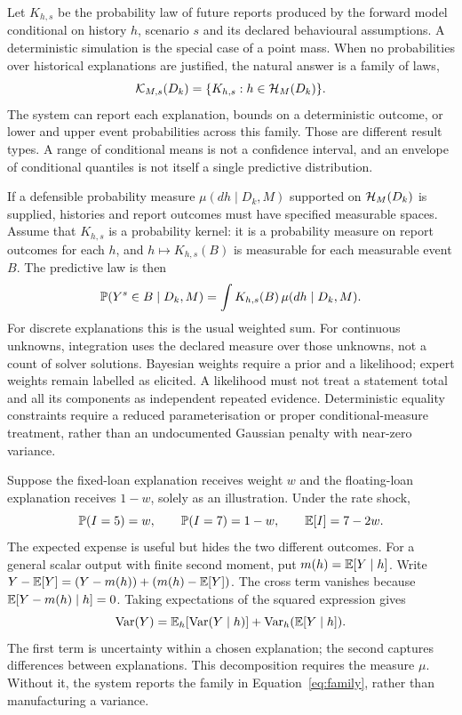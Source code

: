 Let $K_{h,s}$ be the probability law of future reports produced by the forward
model conditional on history $h$, scenario $s$ and its declared behavioural
assumptions. A deterministic simulation is the special case of a point mass.
When no probabilities over historical explanations are justified, the natural
answer is a family of laws,
\begin{equation}\label{eq:family}
 \mathcal{K}_{M,s}(D_k)=\{K_{h,s}:h\in\mathcal{H}_M(D_k)\}.
\end{equation}
The system can report each explanation, bounds on a deterministic outcome,
or lower and upper event probabilities across this family. Those are different
result types. A range of conditional means is not a confidence interval, and
an envelope of conditional quantiles is not itself a single predictive
distribution.

If a defensible probability measure $\mu(dh\mid D_k,M)$ supported on
$\mathcal{H}_M(D_k)$ is supplied, histories and report outcomes must have specified
measurable spaces. Assume that $K_{h,s}$ is a probability kernel: it is a
probability measure on report outcomes for each $h$, and $h\mapsto K_{h,s}(B)$
is measurable for each measurable event $B$. The predictive law is then
\begin{equation}\label{eq:mixture}
 \mathbb{P}(Y^s\in B\mid D_k,M)=
 \int K_{h,s}(B)\,\mu(dh\mid D_k,M).
\end{equation}
For discrete explanations this is the usual weighted sum. For continuous
unknowns, integration uses the declared measure over those unknowns, not a
count of solver solutions. Bayesian weights require a prior and a likelihood;
expert weights remain labelled as elicited. A likelihood must not treat a
statement total and all its components as independent repeated evidence.
Deterministic equality constraints require a reduced parameterisation or
proper conditional-measure treatment, rather than an undocumented Gaussian
penalty with near-zero variance.

Suppose the fixed-loan explanation receives weight $w$ and the floating-loan
explanation receives $1-w$, solely as an illustration. Under the rate shock,
\[
 \mathbb{P}(I=5)=w,\qquad\mathbb{P}(I=7)=1-w,
 \qquad\mathbb{E}[I]=7-2w.
\]
The expected expense is useful but hides the two different outcomes. For a
general scalar output with finite second moment, put $m(h)=\mathbb{E}[Y\mid h]$.
Write $Y-\mathbb{E}[Y]=(Y-m(h))+(m(h)-\mathbb{E}[Y])$. The cross term vanishes because
$\mathbb{E}[Y-m(h)\mid h]=0$. Taking expectations of the squared expression gives
\begin{equation}\label{eq:variance}
 \operatorname{Var}(Y)=
 \mathbb{E}_h[\operatorname{Var}(Y\mid h)]+
 \operatorname{Var}_h(\mathbb{E}[Y\mid h]).
\end{equation}
The first term is uncertainty within a chosen explanation; the second captures
differences between explanations. This decomposition requires the measure
$\mu$. Without it, the system reports the family in
Equation~\eqref{eq:family}, rather than manufacturing a variance.

